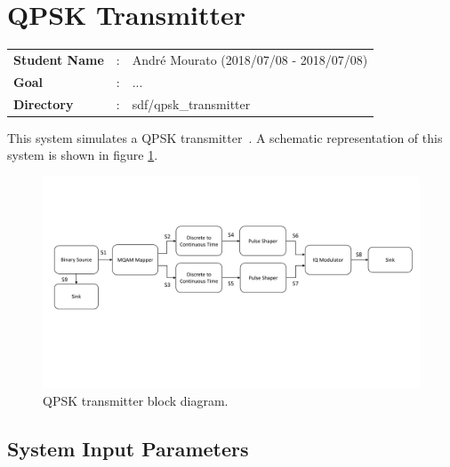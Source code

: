 \section{QPSK Transmitter}

\begin{refsection}

\begin{tcolorbox}	
\begin{tabular}{p{2.75cm} p{0.2cm} p{10.5cm}} 	
\textbf{Student Name}  &:&  Andr\'e Mourato (2018/07/08 - 2018/07/08)\\
\textbf{Goal}          &:& ...\\
\textbf{Directory}     &:& sdf/qpsk\_transmitter
\end{tabular}
\end{tcolorbox}

This system simulates a QPSK transmitter~\cite{loudon2000}. A schematic representation of this system is shown in figure \ref{QPSK_transmitter_block_diagram_simple}.

\begin{figure}[h]
	\centering
	\includegraphics[width=1.0\textwidth]{./sdf/qpsk_transmitter/figures/qpsk_transmitter.pdf}
	\caption{QPSK transmitter block diagram.}\label{QPSK_transmitter_block_diagram_simple}
\end{figure}

\subsection*{System Input Parameters}
\hspace{10mm}
\renewcommand{\labelitemi}{\textbf{Parameter: }}
\renewcommand\labelitemii{\textbf{Description: }}
\renewcommand\labelitemiii{\textbf{Accepted Values: }}
 \begin{itemize}


\end{itemize}
\end{refsection}
